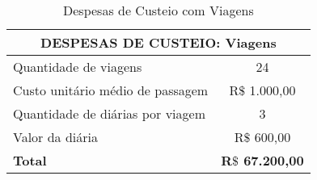 \documentclass[10 pt]{article}
\begin{document}
\begin{table}[h] \label{tab viagens}
  \begin{center}
\begin{tabular}[h!]{|l|c|}
   \hline
\multicolumn{2}{|c|}{{\bf DESPESAS DE CUSTEIO: Viagens}} \\
   \hline
   Quantidade de viagens & 24\\
   \hline
   Custo unitário médio de passagem & R$\$$ 1.000,00\\
   \hline
   Quantidade de diárias por viagem & 3\\
   \hline
   Valor da diária & R$\$$ 600,00\\
   \hline
   {\bf Total} & {\bf R$\$$ 67.200,00} \\
   \hline
\end{tabular}
  \end{center}
  \caption{Despesas de Custeio com Viagens}
 \end{table}
\end{document}

